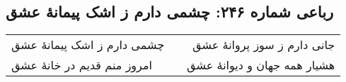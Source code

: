 \begin{center}
\section*{رباعی شماره ۲۴۶: چشمی دارم ز اشک پیمانهٔ عشق}
\label{sec:sh246}
\begin{longtable}{l p{0.5cm} r}
چشمی دارم ز اشک پیمانهٔ عشق
&&
جانی دارم ز سوز پروانهٔ عشق
\\
امروز منم قدیم در خانهٔ عشق
&&
هشیار همه جهان و دیوانهٔ عشق
\\
\end{longtable}
\end{center}
